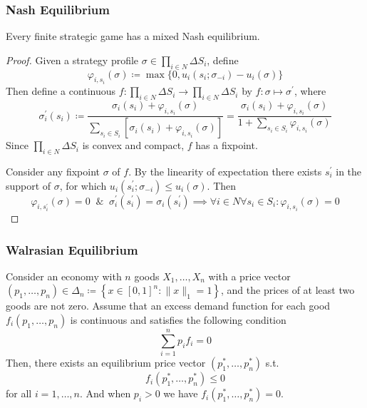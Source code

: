 \documentclass[UTF8,11pt,colorlinks,compress,openany]{beamer}%
\begin{document}
\begin{frame}\frametitle{Nash Equilibrium}
\setlength\abovedisplayskip{0pt}
\setlength\belowdisplayskip{0pt}
\begin{theorem}
	Every finite strategic game has a mixed Nash equilibrium.
\end{theorem}
\begin{proof}
	Given a strategy profile $\sigma\in\prod\limits_{i\in N}\Delta S_i$, define
	\[\varphi_{i,s_i}(\sigma)\coloneqq \max\big\{0,u_i(s_i;\sigma_{-i})-u_i(\sigma)\big\}\]
	Then define a continuous $f: \prod\limits_{i\in N}\Delta S_i\to\prod\limits_{i\in N}\Delta S_i$ by $f: \sigma\mapsto\sigma^\prime$, where
	\[
	\sigma_i^\prime(s_i)\coloneqq \dfrac{\sigma_i(s_i)+\varphi_{i,s_i}(\sigma)}{\sum\limits_{s_i\in S_i}\left[\sigma_i(s_i)+\varphi_{i,s_i}(\sigma)\right]}=\dfrac{\sigma_i(s_i)+\varphi_{i,s_i}(\sigma)}{1+\sum\limits_{s_i\in S_i}\varphi_{i,s_i}(\sigma)}
	\]
	Since $\prod\limits_{i\in N}\Delta S_i$ is convex and compact, $f$ has a fixpoint.

	Consider any fixpoint $\sigma$ of $f$. By the linearity of expectation there exists $s_i^\prime$ in the support of $\sigma$, for which $u_i(s_i^\prime;\sigma_{-i})\leq u_i(\sigma)$. Then
	\[\varphi_{i,s_i^\prime}(\sigma)=0\;\;\&\;\;\sigma_i^\prime(s_i^\prime)=\sigma_i(s_i^\prime)\implies\forall i\in N\forall s_i\in S_i: \varphi_{i,s_i}(\sigma)=0\]
\end{proof}
\end{frame}

\begin{frame}\frametitle{Walrasian Equilibrium}
\begin{theorem}
Consider an economy with $n$ goods $X_1,\dots, X_n$ with a price vector $(p_1,\dots, p_n)\in\Delta_n\coloneqq \left\{x\in[0,1]^n:\|x\|_1=1\right\}$, and the prices of at least two goods are not zero. Assume that an excess demand function for each good $f_i(p_1,\dots, p_n)$ is continuous and satisfies the following condition
\[\sum\limits_{i=1}^n p_if_i=0\tag{Walras Law}\]
Then, there exists an equilibrium price vector $(p_1^*,\dots,p_n^*)$ s.t.
\[f_i(p_1^*,\dots,p_n^*)\leq 0\]
for all $i=1,\dots,n$. And when $p_i>0$ we have $f_i(p_1^*,\dots,p_n^*)=0$.
\end{theorem}
\end{frame}
\end{document}
